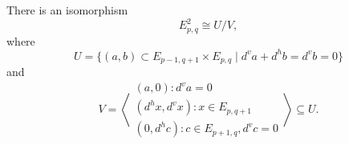 \documentclass[main.tex]{subfiles}
\begin{document}
\begin{proposition}
  There is an isomorphism
  \begin{equation*}
    E^{2}_{p, q} \cong U/V,
  \end{equation*}
  where
  \begin{equation*}
    U = \{(a, b) \subset E_{p-1, q+1} \times E_{p, q} \mid d^{v}a + d^{h}b = d^{v}b = 0 \}
  \end{equation*}
  and
  \begin{equation*}
    V = \left\langle \substack{(a, 0)\colon d^{v}a = 0\\ (d^{h}x, d^{v}x)\colon x \in E_{p, q+1}\\ (0, d^{h}c)\colon c \in E_{p+1, q}, d^{v}c = 0} \right\rangle \subseteq U.
  \end{equation*}
\end{proposition}
\end{document}
